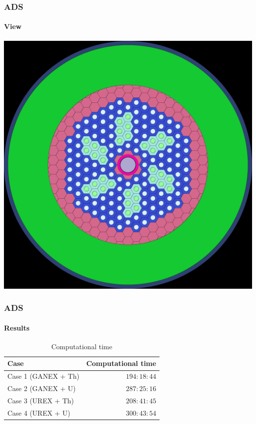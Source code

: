 \documentclass[svgnames,smaller,table]{beamer}
\begin{document}
\begin{frame}
  \frametitle{ADS}
  \framesubtitle{View}
  \begin{center}
    \includegraphics[scale=0.1]{figuras/50Th_geom1.png}
    \end{center}
\end{frame}

\begin{frame}
  \frametitle{ADS}
  \framesubtitle{Results}
  \begin{table}%
    \caption{Computational time}
    \label{time}
    \centering
    \vspace{0.5cm}
    \begin{tabular}{l|r}\hline   
      Case & Computational time\\ \hline
      Case 1 (GANEX + Th) & $194:18:44 $\\ \hline
      Case 2 (GANEX + U) & $287:25:16 $\\ \hline
      Case 3 (UREX + Th) & $208:41:45 $\\ \hline
      Case 4 (UREX + U) & $300:43:54 $\\ \hline
    \end{tabular}
  \end{table}
  
\end{frame}
\end{document}
